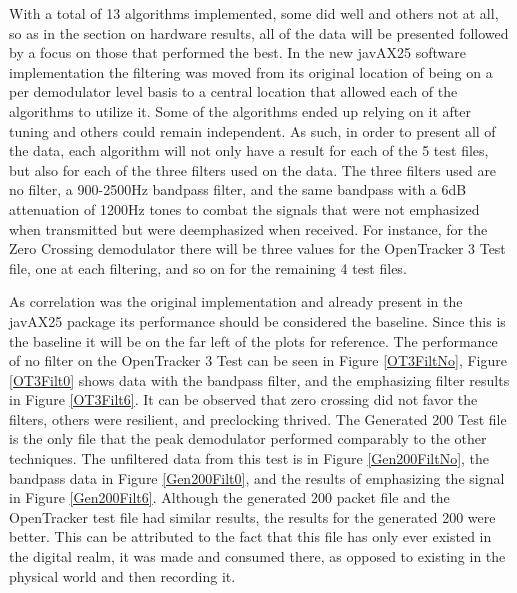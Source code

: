 With a total of 13 algorithms implemented, some did well and others not at all, so as in the section on hardware results, all of the data will be presented followed by a focus on those that performed the best. In the new javAX25 software implementation the filtering was moved from its original location of being on a per demodulator level basis to a central location that allowed each of the algorithms to utilize it. Some of the algorithms ended up relying on it after tuning and others could remain independent. As such, in order to present all of the data, each algorithm will not only have a result for each of the 5 test files, but also for each of the three filters used on the data. The three filters used are no filter, a 900-2500Hz bandpass filter, and the same bandpass with a 6dB attenuation of 1200Hz tones to combat the signals that were not emphasized when transmitted but were deemphasized when received. For instance, for the Zero Crossing demodulator there will be three values for the OpenTracker 3 Test file, one at each filtering, and so on for the remaining 4 test files.

As correlation was the original implementation and already present in the javAX25 package its performance should be considered the baseline. Since this is the baseline it will be on the far left of the plots for reference. The performance of no filter on the OpenTracker 3 Test can be seen in Figure \ref{OT3FiltNo}, Figure \ref{OT3Filt0} shows data with the bandpass filter, and the emphasizing filter results in Figure \ref{OT3Filt6}. It can be observed that zero crossing did not favor the filters, others were resilient, and preclocking thrived. The Generated 200 Test file is the only file that the peak demodulator performed comparably to the other techniques. The unfiltered data from this test is in Figure \ref{Gen200FiltNo}, the bandpass data in Figure \ref{Gen200Filt0}, and the results of emphasizing the signal in Figure \ref{Gen200Filt6}. Although the generated 200 packet file and the OpenTracker test file had similar results, the results for the generated 200 were better. This can be attributed to the fact that this file has only ever existed in the digital realm, it was made and consumed there, as opposed to existing in the physical world and then recording it.

